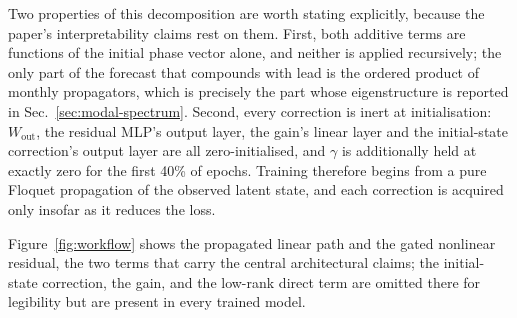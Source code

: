 Two properties of this decomposition are worth stating explicitly, because the paper's
interpretability claims rest on them. First, both additive terms are functions of the initial
phase vector alone, and neither is applied recursively; the only part of the forecast that
compounds with lead is the ordered product of monthly propagators, which is precisely the part
whose eigenstructure is reported in Sec.~\ref{sec:modal-spectrum}. Second, every correction is
inert at initialisation: $W_{\mathrm{out}}$, the residual MLP's output layer, the gain's linear
layer and the initial-state correction's output layer are all zero-initialised, and $\gamma$ is
additionally held at exactly zero for the first 40\% of epochs. Training therefore begins from
a pure Floquet propagation of the observed latent state, and each correction is acquired only
insofar as it reduces the loss.

Figure~\ref{fig:workflow} shows the propagated linear path and the gated nonlinear residual,
the two terms that carry the central architectural claims; the initial-state correction, the
gain, and the low-rank direct term are omitted there for legibility but are present in every
trained model.

